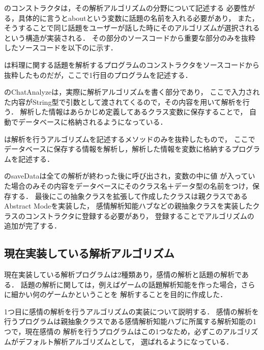 のコンストラクタは，その解析アルゴリズムの分野について記述する
必要性がる，具体的に言うとaboutという変数に話題の名前を入れる必要があり，
また，そうすることで同じ話題をユーザーが話した時にそのアルゴリズムが選択されるという構造が実装される．
その部分のソースコードから重要な部分のみを抜粋したソースコードを以下のに示す．


は料理に関する話題を解析するプログラムのコンストラクタをソースコードから
抜粋したものだが，ここで1行目のプログラムを記述する．

のChatAnalyzeは，実際に解析アルゴリズムを書く部分であり，
ここで入力された内容がString型で引数として渡されてくるので，その内容を用いて解析を行う．
解析した情報はあらかじめ定義してあるクラス変数に保存することで，
自動でデータベースに格納されるようになっている．


は解析を行うアルゴリズムを記述するメソッドのみを抜粋したもので，
ここでデータベースに保存する情報を解析し，解析した情報を変数に格納するプログラムを記述する．

のsaveDataは全ての解析が終わった後に呼び出され，変数の中に値
が入っていた場合のみその内容をデータベースにそのクラス名＋データ型の名前をつけ，保存する．
最後にこの抽象クラスを拡張して作成したクラスは親クラスであるAbstract Modeを実装した，
感情解析知能ハブなどの親抽象クラスを実装したクラスのコンストラクタに登録する必要があり，
登録することでアルゴリズムの追加が完了する．

\subsection{現在実装している解析アルゴリズム}
現在実装している解析プログラムは2種類あり，感情の解析と話題の解析である．
話題の解析に関しては，例えばゲームの話題解析知能を作った場合，さらに細かい何のゲームかということを
解析することを目的に作成した．

1つ目に感情の解析を行うアルゴリズムの実装について説明する．
感情の解析を行うプログラムは親抽象クラスである感情解析知能ハブに所属する解析知能の1つで，現在感情の
解析を行うプログラムはこの1つなため，必ずこのアルゴリズムがデフォルト解析アルゴリズムとして，
選ばれるようになっている．

